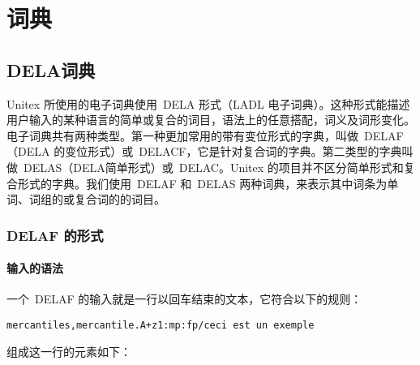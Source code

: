 \chapter{词典}
\label{chap-dictionaries}

\section{DELA词典}

Unitex 所使用的电子词典使用\ DELA 形式（LADL 电子词典）。这种形式能描述用户输入的某种语言的简单或复合的词目，语法上的任意搭配，词义及词形变化。电子词典共有两种类型。第一种更加常用的带有变位形式的字典，叫做\ DELAF（DELA 的变位形式）或\ DELACF，它是针对复合词的字典。第二类型的字典叫做\ DELAS（DELA简单形式）或\ DELAC。Unitex  的项目并不区分简单形式和复合形式的字典。我们使用\ DELAF 和\ DELAS 两种词典，来表示其中词条为单词、词组的或复合词的的词目。 

\subsection{DELAF 的形式}
\label{section-DELAF-format}
\subsubsection{输入的语法}
\label{section-DELAF-entry-syntax}
一个\ DELAF 的输入就是一行以回车结束的文本，它符合以下的规则：

\bigskip
\begin{verbatim}
mercantiles,mercantile.A+z1:mp:fp/ceci est un exemple
\end{verbatim}

\bigskip
\noindent 组成这一行的元素如下：

